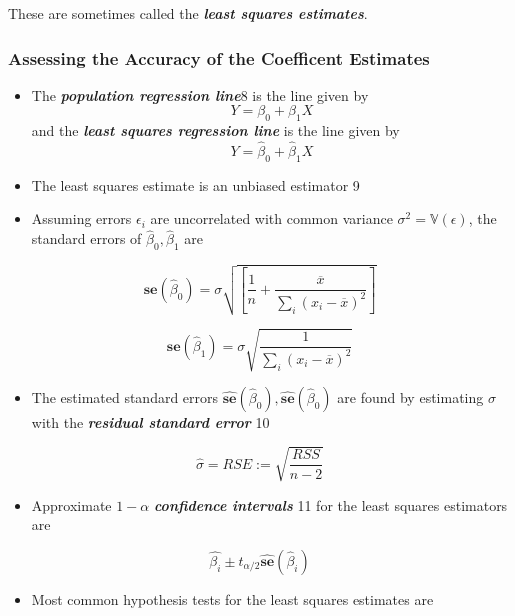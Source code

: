 \documentclass[11pt]{article}
\providecommand{\tightlist}{%
      \setlength{\itemsep}{0pt}\setlength{\parskip}{0pt}}
\begin{document}
These are sometimes called the \textbf{\emph{least squares estimates}}.

    \hypertarget{assessing-the-accuracy-of-the-coefficent-estimates}{%
\subsubsection{Assessing the Accuracy of the Coefficent
Estimates}\label{assessing-the-accuracy-of-the-coefficent-estimates}}

    \begin{itemize}
\item
  The \textbf{\emph{population regression line}}8 is the line given by
  \[ Y = \beta_0 + \beta_1 X \] and the \textbf{\emph{least squares
  regression line}} is the line given by
  \[ Y = \hat{\beta}_0 + \hat{\beta}_1 X \]
\item
  The least squares estimate is an unbiased estimator 9
\item
  Assuming errors \(\epsilon_i\) are uncorrelated with common variance
  \(\sigma^2=\mathbb{V}(\epsilon)\), the standard errors of
  \(\hat{\beta}_0, \hat{\beta}_1\) are
\end{itemize}

\[
\mathbf{se}(\hat{\beta}_0) = \sigma\sqrt{\left[\frac{1}{n} + \frac{\overline{x}}{\sum_i (x_i - \overline{x})^2}\right]}
\]

\[
\mathbf{se}(\hat{\beta}_1) = \sigma\sqrt{\frac{1}{\sum_i (x_i - \overline{x})^2}}
\]

\begin{itemize}
\tightlist
\item
  The estimated standard errors
  \(\hat{\mathbf{se}}(\hat{\beta}_0), \hat{\mathbf{se}}(\hat{\beta}_0)\)
  are found by estimating \(\sigma\) with the \textbf{\emph{residual
  standard error}} 10
\end{itemize}

\[ \hat{\sigma} = RSE := \sqrt{\frac{RSS}{n-2}} \]

\begin{itemize}
\tightlist
\item
  Approximate \(1 - \alpha\) \textbf{\emph{confidence intervals}} 11 for
  the least squares estimators are
\end{itemize}

\[ \hat{\beta_i} \pm t_{\alpha/2}\hat{\mathbf{se}}(\hat{\beta}_i)
\]

\begin{itemize}
\tightlist
\item
  Most common hypothesis tests for the least squares estimates are
\end{itemize}
\end{document}

